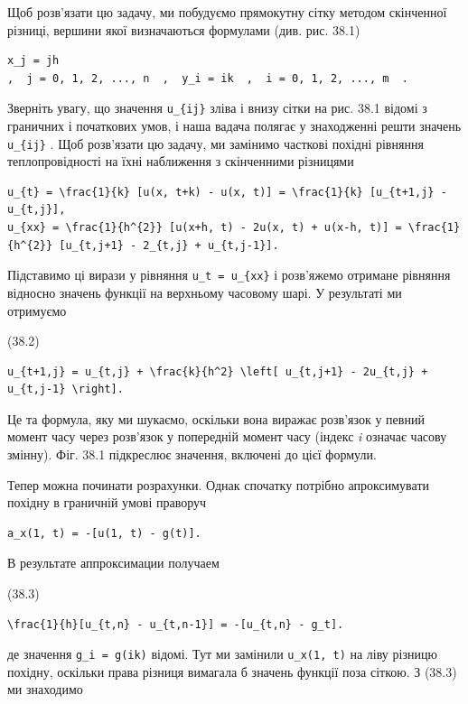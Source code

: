 \documentclass[
  ukrainian,
]{article}
\begin{document}
Щоб розв'язати цю задачу, ми побудуємо прямокутну сітку методом
скінченної різниці, вершини якої визначаються формулами (див. рис. 38.1)

\begin{verbatim}
x_j = jh
,  j = 0, 1, 2, ..., n  ,  y_i = ik  ,  i = 0, 1, 2, ..., m  .
\end{verbatim}

Зверніть увагу, що значення \texttt{u\_\{ij\}} зліва і внизу сітки на
рис. 38.1 відомі з граничних і початкових умов, і наша вадача полягає у
знаходженні решти значень \texttt{u\_\{ij\}} . Щоб розв'язати цю задачу,
ми замінимо часткові похідні рівняння теплопровідності на їхні
наближення з скінченними різницями

\begin{verbatim}
u_{t} = \frac{1}{k} [u(x, t+k) - u(x, t)] = \frac{1}{k} [u_{t+1,j} - u_{t,j}],
u_{xx} = \frac{1}{h^{2}} [u(x+h, t) - 2u(x, t) + u(x-h, t)] = \frac{1}{h^{2}} [u_{t,j+1} - 2_{t,j} + u_{t,j-1}].
\end{verbatim}

Підставимо ці вирази у рівняння \texttt{u\_t\ =\ u\_\{xx\}} і розв'яжемо
отримане рівняння відносно значень функції на верхньому часовому шарі. У
результаті ми отримуємо

(38.2)

\begin{verbatim}
u_{t+1,j} = u_{t,j} + \frac{k}{h^2} \left[ u_{t,j+1} - 2u_{t,j} + u_{t,j-1} \right].
\end{verbatim}

Це та формула, яку ми шукаємо, оскільки вона виражає розв'язок у певний
момент часу через розв'язок у попередній момент часу (індекс \emph{i}
означає часову змінну). Фіг. 38.1 підкреслює значення, включені до цієї
формули.

Тепер можна починати розрахунки. Однак спочатку потрібно апроксимувати
похідну в граничній умові праворуч

\begin{verbatim}
a_x(1, t) = -[u(1, t) - g(t)].
\end{verbatim}

В результате аппроксимации получаем

(38.3)

\begin{verbatim}
\frac{1}{h}[u_{t,n} - u_{t,n-1}] = -[u_{t,n} - g_t].
\end{verbatim}

де значення \texttt{g\_i\ =\ g(ik)} відомі. Тут ми замінили
\texttt{u\_x(1,\ t)} на ліву різницю похідну, оскільки права різниця
вимагала б значень функції поза сіткою. З (38.3) ми знаходимо
\end{document}
